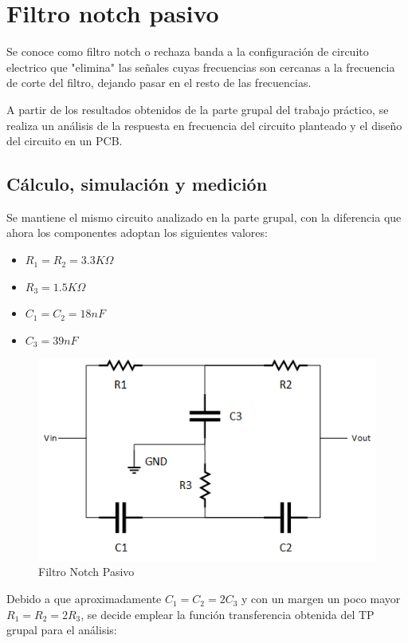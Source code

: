 \section{Filtro notch pasivo}

Se conoce como filtro notch o rechaza banda a la configuración de circuito electrico que "elimina" las señales cuyas frecuencias son cercanas a la frecuencia de corte del filtro, dejando pasar en el resto de las frecuencias.

A partir de los resultados obtenidos de la parte grupal del trabajo práctico, se realiza un análisis de la respuesta en frecuencia del circuito planteado y el diseño del circuito en un PCB.

\subsection{Cálculo, simulación y medición}

Se mantiene el mismo circuito analizado en la parte grupal, con la diferencia que ahora los componentes adoptan los siguientes valores:

\begin{itemize}[leftmargin=2cm]
	\item $R_1 = R_2 = 3.3K\Omega$
	\item $R_3 = 1.5K\Omega$
	\item $C_1 = C_2 = 18nF$
	\item $C_3 = 39nF$
  \end{itemize}

\begin{figure}[h]
	\centering
	\includegraphics[scale=1]{../Informe/Imagenes/circuito.png}
	\caption{Filtro Notch Pasivo}
	\label{ej1cir}
\end{figure}

Debido a que aproximadamente $C_1 = C_2 = 2C_3$ y con un margen un poco mayor $R_1 = R_2 = 2R_3$, se decide emplear la función transferencia obtenida del TP grupal para el análisis:

